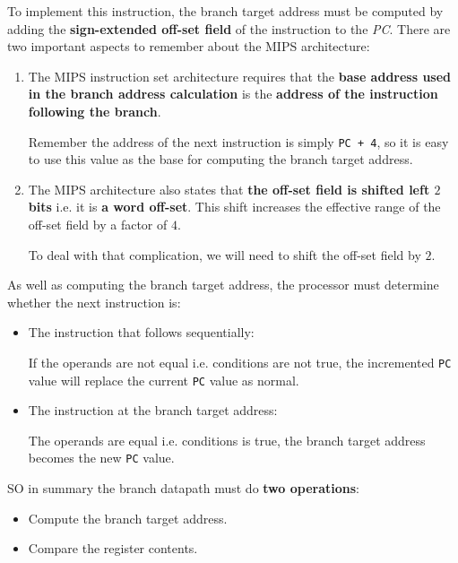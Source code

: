 \documentclass[10pt,a4paper]{article}
\begin{document}
To implement this instruction, the branch target address must be computed by adding the
\textbf{sign-extended off-set field} of the instruction to the \textit{PC}. There are two important
aspects to remember about the MIPS architecture:
\begin{enumerate}
    \item  The MIPS instruction set architecture requires that the \textbf{base address used in the
    branch address calculation} is the \textbf{address of the instruction following the branch}.

    Remember the address of the next instruction is simply \texttt{PC + 4}, so it is easy to use
    this value as the base for computing the branch target address.
    
    \item  The MIPS architecture also states that \textbf{the off-set field is shifted left $2$ bits} i.e. it is \textbf{a word off-set}. This shift increases the effective range of the off-set field by a
    factor of $4$.

    To deal with that complication, we will need to shift the off-set field by $2$.
\end{enumerate} 

As well as computing the branch target address, the processor must determine whether the next
instruction is:
\begin{itemize}
    \item The instruction that follows sequentially:
    
    If the operands are not equal i.e. conditions are not true, the incremented \texttt{PC} value
    will replace the current \texttt{PC} value as normal.

    \item The instruction at the branch target address: 
    
    The operands are equal i.e. conditions is true, the branch target address becomes the new
    \texttt{PC} value.
\end{itemize}

SO in summary the branch datapath must do \textbf{two operations}: 
\begin{itemize}
    \item Compute the branch target address.
    \item Compare the register contents.
\end{itemize} 
\end{document}
